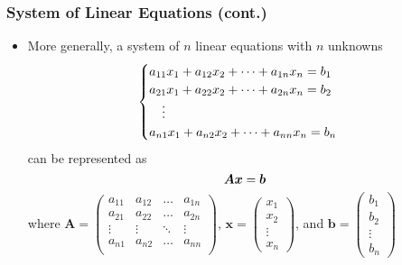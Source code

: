 \documentclass[pdflatex, 12pt]{beamer}
\begin{document}
\begin{frame}
\frametitle{System of Linear Equations (cont.)}
\begin{itemize}
\item More generally, a system of $n$ linear equations with $n$ unknowns 
 {\small
 \begin{eqnarray}
 \begin{cases}
 a_{11} x_1  + a_{12} x_2 + \cdots + a_{1n} x_n = b_1 \\
 a_{21} x_1  + a_{22} x_2 + \cdots + a_{2n} x_n = b_2 \\
 \ \ \ \vdots \\
 a_{n1} x_1  + a_{n2} x_2 + \cdots + a_{nn} x_n = b_n \notag
 \end{cases}
 \end{eqnarray}
 }
can be represented as 
 \begin{equation}
 \bm{Ax} = \bm{b} \notag 
 \end{equation}
where {\small $\bm{A} = \begin{pmatrix}
a_{11} & a_{12} & \ldots & a_{1n} \\
a_{21} & a_{22} & \ldots & a_{2n} \\
\vdots & \vdots & \ddots & \vdots \\
a_{n1} & a_{n2} & \ldots & a_{nn} \\
\end{pmatrix}$}, {\small $\bm{x} = \begin{pmatrix}
x_1 \\
x_2 \\
\vdots \\
x_n
\end{pmatrix}$}, and {\small $\bm{b} = \begin{pmatrix}
b_1 \\
b_2 \\
\vdots \\
b_n
\end{pmatrix}$}
\end{itemize}
\end{frame}
\end{document}
